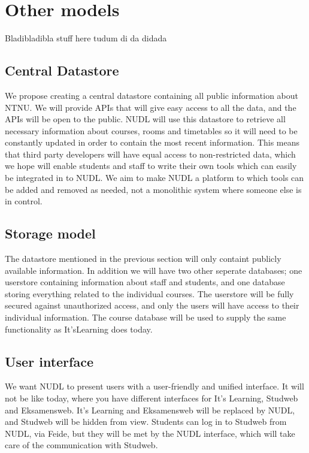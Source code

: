 \section{Other models}
	Bladibladibla stuff here tudum di da didada
	
	\subsection{Central Datastore}
		We propose creating a central datastore containing all public information about NTNU. We will provide APIs that will give easy access to all the data, and the APIs will be open to the public. 
NUDL will use this datastore to retrieve all necessary information about courses, rooms and timetables so it will need to be constantly updated in order to contain the most recent information. This means that third party developers will have equal access to non-restricted data, which we hope will enable students and staff to write their own tools which can easily be integrated in to NUDL. We aim to make NUDL a platform to which tools can be added and removed as needed, not a monolithic system where someone else is in control. 

	\subsection{Storage model}
		The datastore mentioned in the previous section will only containt publicly available information. In addition we will have two other seperate databases; one userstore containing information about staff and students, and one database storing everything related to the individual courses. The userstore will be fully secured against unauthorized access, and only the users will have access to their individual information. The course database will be used to supply the same functionality as It'sLearning does today. 
		
	\subsection{User interface} 
		We want NUDL to present users with a user-friendly and unified interface. It will not be like today, where you have different interfaces for It's Learning, Studweb and Eksamensweb. It's Learning and Eksamensweb will be replaced by NUDL, and Studweb will be hidden from view. Students can log in to Studweb from NUDL, via Feide, but they will be met by the NUDL interface, which will take care of the communication with Studweb.